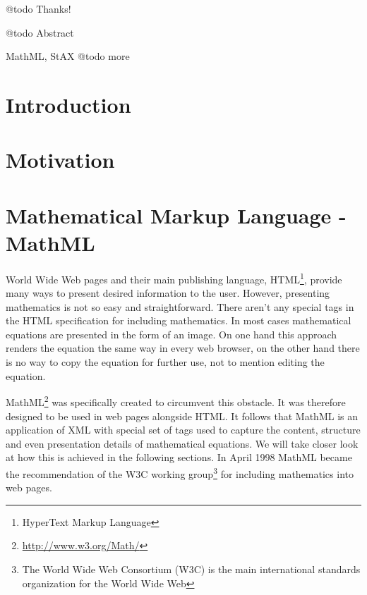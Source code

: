 \documentclass[11pt,oneside,final]{fithesis2}
\begin{document}



\FrontMatter
\ThesisTitlePage

\begin{ThesisDeclaration}
\DeclarationText
\AdvisorName
\end{ThesisDeclaration}

\begin{ThesisThanks}
@todo Thanks!
\end{ThesisThanks}

\begin{ThesisAbstract}
@todo Abstract
\end{ThesisAbstract}

\begin{ThesisKeyWords}
MathML, StAX  @todo more
\end{ThesisKeyWords}

\MainMatter
\tableofcontents

\chapter{Introduction}

\chapter{Motivation}

\chapter{Mathematical Markup Language - MathML}
World Wide Web pages and their main publishing language, HTML\footnote{HyperText Markup Language}, provide many ways to present desired information to the user. However, presenting mathematics is not so easy and straightforward. There aren't any special tags in the HTML specification for including mathematics. In most cases mathematical equations are presented in the form of an image. On one hand this approach renders the equation the same way in every web browser, on the other hand there is no way to copy the equation for further use, not to mention editing the equation. 

MathML\footnote{\url{http://www.w3.org/Math/}} was specifically created to circumvent this obstacle. It was therefore designed to be used in web pages alongside HTML. It follows that MathML is an application of XML with special set of tags used to capture the content, structure and even presentation details of mathematical equations. We will take closer look at how this is achieved in the following sections. In April 1998 MathML became the recommendation of the W3C working group\footnote{The World Wide Web Consortium (W3C) is the main international standards organization for the World Wide Web} for including mathematics into web pages.
\end{document}
